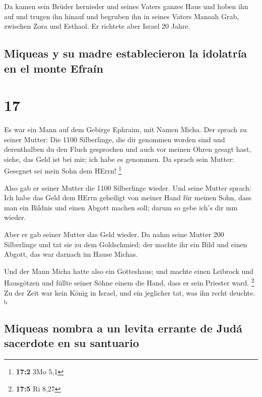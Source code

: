  Da kamen sein Brüder hernieder und seines Vaters ganzes
Haus und hoben ihn auf und trugen ihn hinauf und begruben ihn in seines
Vaters Manoah Grab, zwischen Zora und Esthaol. Er richtete aber Israel
20 Jahre.

\hypertarget{miqueas-y-su-madre-establecieron-la-idolatruxeda-en-el-monte-efrauxedn}{%
\subsection{Miqueas y su madre establecieron la idolatría en el monte
Efraín}\label{miqueas-y-su-madre-establecieron-la-idolatruxeda-en-el-monte-efrauxedn}}

\hypertarget{section-16}{%
\section{17}\label{section-16}}

 Es war ein Mann auf dem Gebirge Ephraim, mit Namen Micha.
 Der sprach zu seiner Mutter: Die 1100 Silberlinge, die
dir genommen worden sind und derenthalben du den Fluch gesprochen und
auch vor meinen Ohren gesagt hast, siehe, das Geld ist bei mir; ich habe
es genommen. Da sprach sein Mutter: Gesegnet sei mein Sohn dem HErrn!
\footnote{\textbf{17:2} 3Mo 5,1}

 Also gab er seiner Mutter die 1100 Silberlinge wieder.
Und seine Mutter sprach: Ich habe das Geld dem HErrn geheiligt von
meiner Hand für meinen Sohn, dass man ein Bildnis und einen Abgott
machen soll; darum so gebe ich's dir nun wieder.

 Aber er gab seiner Mutter das Geld wieder. Da nahm seine
Mutter 200 Silberlinge und tat sie zu dem Goldschmied; der machte ihr
ein Bild und einen Abgott, das war darnach im Hause Michas.

 Und der Mann Micha hatte also ein Gotteshaus; und machte
einen Leibrock und Hausgötzen und füllte seiner Söhne einem die Hand,
dass er sein Priester ward. \footnote{\textbf{17:5} Ri 8,27}
 Zu der Zeit war kein König in Israel, und ein jeglicher
tat, was ihn recht deuchte. \textsuperscript{b}

\hypertarget{miqueas-nombra-a-un-levita-errante-de-juduxe1-sacerdote-en-su-santuario}{%
\subsection{Miqueas nombra a un levita errante de Judá sacerdote en su
santuario}\label{miqueas-nombra-a-un-levita-errante-de-juduxe1-sacerdote-en-su-santuario}}


